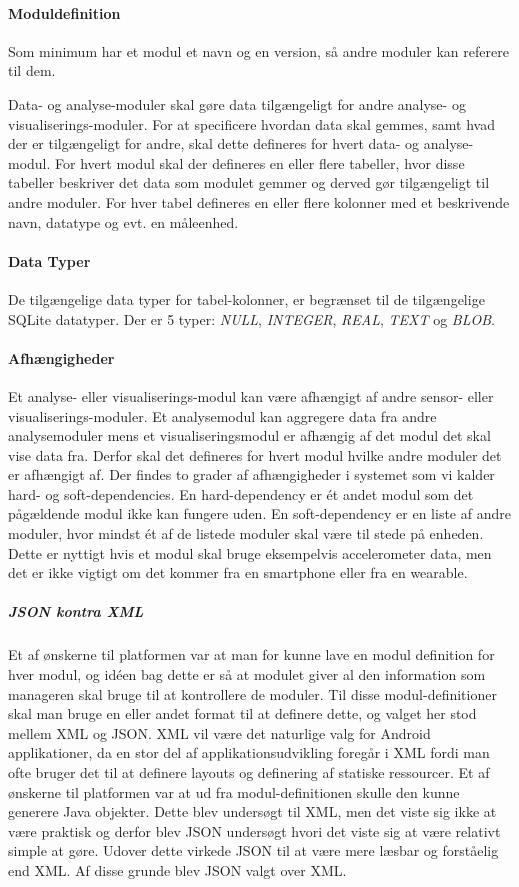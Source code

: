 \paragraph{Moduldefinition}
Som minimum har et modul et navn og en version, så andre moduler kan referere til dem.

Data- og analyse-moduler skal gøre data tilgængeligt for andre analyse- og visualiserings-moduler.
For at specificere hvordan data skal gemmes, samt hvad der er tilgængeligt for andre, skal dette defineres for hvert data- og analyse-modul.
For hvert modul skal der defineres en eller flere tabeller, hvor disse tabeller beskriver det data som modulet gemmer og derved gør tilgængeligt til andre moduler.
For hver tabel defineres en eller flere kolonner med et beskrivende navn, datatype og evt. en måleenhed.

\paragraph{Data Typer}
De tilgængelige data typer for tabel-kolonner, er begrænset til de tilgængelige SQLite datatyper.
Der er 5 typer: \textit{NULL}, \textit{INTEGER}, \textit{REAL}, \textit{TEXT} og \textit{BLOB}.

\paragraph{Afhængigheder}
Et analyse- eller visualiserings-modul kan være afhængigt af andre sensor- eller visualiserings-moduler.
Et analysemodul kan aggregere data fra andre analysemoduler mens et visualiseringsmodul er afhængig af det modul det skal vise data fra.
Derfor skal det defineres for hvert modul hvilke andre moduler det er afhængigt af.
Der findes to grader af afhængigheder i systemet som vi kalder hard- og soft-dependencies.
En hard-dependency er ét andet modul som det pågældende modul ikke kan fungere uden.
En soft-dependency er en liste af andre moduler, hvor mindst ét af de listede moduler skal være til stede på enheden.
Dette er nyttigt hvis et modul skal bruge eksempelvis accelerometer data, men det er ikke vigtigt om det kommer fra en smartphone eller fra en wearable.

\subparagraph{JSON kontra XML}
Et af ønskerne til platformen var at man for kunne lave en modul definition for hver modul, og idéen bag dette er så at modulet giver al den information som manageren skal bruge til at kontrollere de moduler. 
Til disse modul-definitioner skal man bruge en eller andet format til at definere dette, og valget her stod mellem XML og JSON.
XML vil være det naturlige valg for Android applikationer, da en stor del af  applikationsudvikling foregår i XML fordi man ofte bruger det til at definere layouts og definering af statiske ressourcer. 
Et af ønskerne til platformen var at ud fra modul-definitionen skulle den kunne generere Java objekter.
Dette blev undersøgt til XML, men det viste sig ikke at være praktisk og derfor blev JSON undersøgt hvori det viste sig at være relativt simple at gøre.
Udover dette virkede JSON til at være mere læsbar og forståelig end XML.
Af disse grunde blev JSON valgt over XML.

